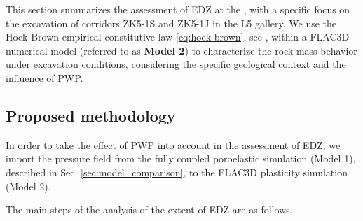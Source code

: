 

This section summarizes the assessment of \gls{EDZ} at the \URFBII, with a specific focus on the excavation of corridors ZK5-1S and ZK5-1J in the L5 gallery. We use the Hoek-Brown empirical constitutive law \eqref{eq:hoek-brown}, see \cite{hoek2019hoek}, within a FLAC3D numerical model (referred to as \textbf{Model 2}) to characterize the rock mass behavior under excavation conditions, considering the specific geological context and the influence of \Gls{PWP}.





 
\subsection{Proposed methodology}

In order to take the effect of \Gls{PWP} into account in the assessment of \Gls{EDZ}, we import the pressure field from the fully coupled poroelastic simulation (Model 1), described in Sec. \ref{sec:model_comparison}, to the FLAC3D plasticity simulation (Model 2).

The main steps of the analysis of the extent of \Gls{EDZ} are as follows.

